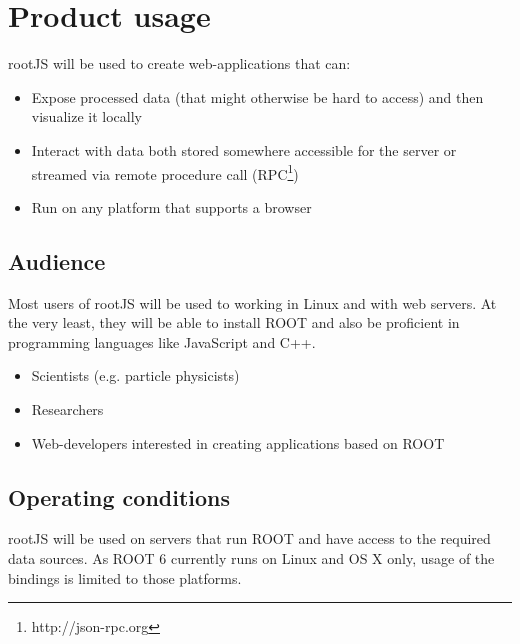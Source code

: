 \chapter{Product usage}

rootJS will be used to create web-applications that can:
\begin{itemize}
	\item Expose processed data (that might otherwise be hard to access) and then visualize it locally
	\item Interact with data both stored somewhere accessible for the server or streamed via remote procedure call (RPC\footnote{http://json-rpc.org})
	\item Run on any platform that supports a browser
\end{itemize}


\section{Audience}
Most users of rootJS will be used to working in Linux and with web servers. At the very least, they will be able to install ROOT
and also be proficient in programming languages like JavaScript and C++.
\begin{itemize}
	\item Scientists (e.g. particle physicists)
	\item Researchers
	\item Web-developers interested in creating applications based on ROOT
\end{itemize}

\section{Operating conditions}

rootJS will be used on servers that run ROOT and have access to the required data sources. As ROOT 6 currently runs on Linux and OS X only, usage of the bindings is limited to those platforms.
